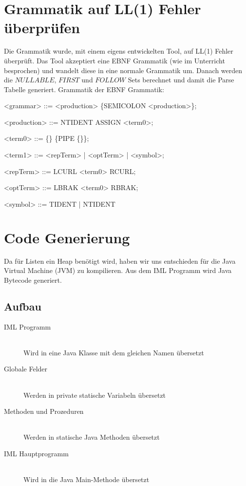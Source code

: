 \documentclass[a4paper,notitlepage,oneside]{article}
\begin{document}
\section{Grammatik auf LL(1) Fehler überprüfen}
Die Grammatik wurde, mit einem eigens entwickelten Tool, auf LL(1) Fehler überprüft. Das Tool akzeptiert eine EBNF Grammatik (wie im Unterricht besprochen) und wandelt diese in eine normale Grammatik um. Danach werden die $NULLABLE$, $FIRST$ und $FOLLOW$ Sets berechnet und damit die Parse Tabelle generiert. Grammatik der EBNF Grammatik:
\begin{grammar}
<grammar> ::= <production> \{SEMICOLON <production>\};

<production> ::= NTIDENT ASSIGN <term0>;

<term0> ::= \{<term1>\} \{PIPE \{<term1>\}\};

<term1> ::= <repTerm> | <optTerm> | <symbol>;

<repTerm> ::= LCURL <term0> RCURL;

<optTerm> ::= LBRAK <term0> RBRAK;

<symbol> ::= TIDENT | NTIDENT
\end{grammar}

\section{Code Generierung}
Da für Listen ein Heap benötigt wird, haben wir uns entschieden für die Java Virtual Machine (JVM) zu kompilieren. Aus dem IML Programm wird Java Bytecode generiert.

\subsection{Aufbau}
\begin{description}
	\item[IML Programm] \hfill \\
	Wird in eine Java Klasse mit dem gleichen Namen 		übersetzt
	\item[Globale Felder] \hfill \\
	Werden in private statische Variabeln übersetzt
	\item[Methoden und Prozeduren] \hfill \\
	Werden in statische Java Methoden übersetzt
	\item[IML Hauptprogramm] \hfill \\
	Wird in die Java Main-Methode übersetzt
\end{description}
\end{document}
